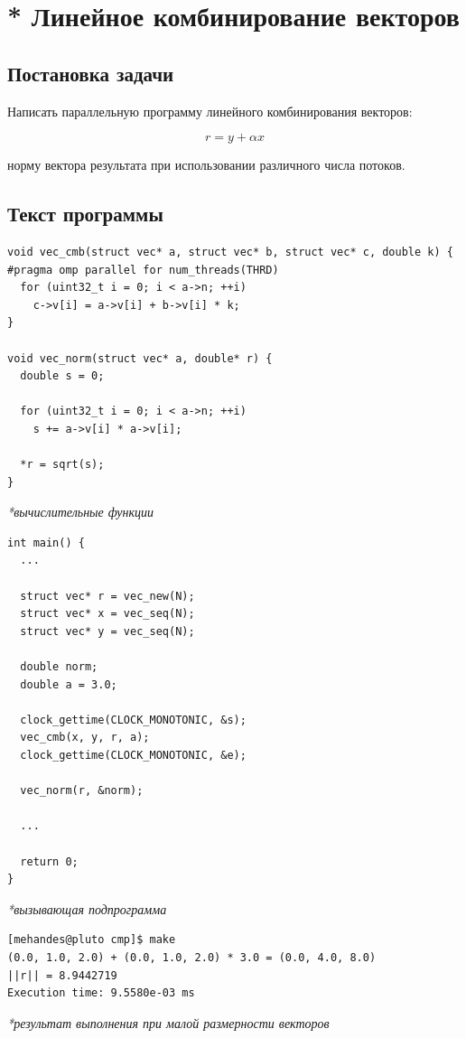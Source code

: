 \documentclass[12pt, a4paper]{article}
\begin{document}
\section{* Линейное комбинирование векторов}
\subsection{Постановка задачи}
Написать параллельную программу линейного комбинирования векторов:

$$ r = y + \alpha x $$

 норму вектора результата при использовании различного числа потоков.

\subsection{Текст программы}
\begin{verbatim}
void vec_cmb(struct vec* a, struct vec* b, struct vec* c, double k) {
#pragma omp parallel for num_threads(THRD)
  for (uint32_t i = 0; i < a->n; ++i)
    c->v[i] = a->v[i] + b->v[i] * k;
}

void vec_norm(struct vec* a, double* r) {
  double s = 0;

  for (uint32_t i = 0; i < a->n; ++i)
    s += a->v[i] * a->v[i];

  *r = sqrt(s);
}
\end{verbatim}
\textit{*вычислительные функции}

\begin{verbatim}
int main() {
  ...

  struct vec* r = vec_new(N);
  struct vec* x = vec_seq(N);
  struct vec* y = vec_seq(N);

  double norm;
  double a = 3.0;

  clock_gettime(CLOCK_MONOTONIC, &s);
  vec_cmb(x, y, r, a);
  clock_gettime(CLOCK_MONOTONIC, &e);

  vec_norm(r, &norm);

  ...

  return 0;
}
\end{verbatim}
\textit{*вызывающая подпрограмма}

\begin{verbatim}
[mehandes@pluto cmp]$ make
(0.0, 1.0, 2.0) + (0.0, 1.0, 2.0) * 3.0 = (0.0, 4.0, 8.0)
||r|| = 8.9442719
Execution time: 9.5580e-03 ms
\end{verbatim}
\textit{*результат выполнения при малой размерности векторов}

\newpage
\end{document}
